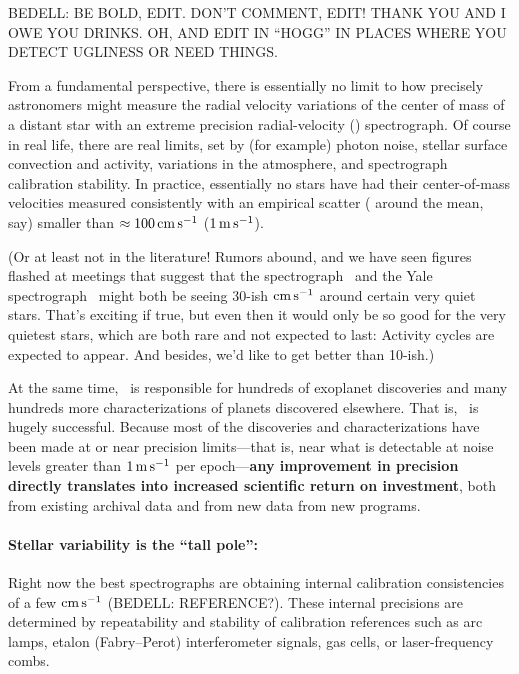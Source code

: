 \documentclass[12pt, letterpaper]{article}
\begin{document}
\sloppy\sloppypar\raggedbottom\frenchspacing

BEDELL: BE BOLD, EDIT. DON'T COMMENT, EDIT! THANK YOU AND I OWE YOU DRINKS. OH, AND EDIT IN ``HOGG'' IN PLACES WHERE YOU DETECT UGLINESS OR NEED THINGS.


\noindent
From a fundamental perspective, there is essentially no limit to how
precisely astronomers might measure the radial velocity variations
of the center of mass
of a distant star with an extreme precision radial-velocity (\EPRV) spectrograph.
Of course in real life, there are real limits, set
by (for example) photon noise, stellar surface convection and activity,
variations in the atmosphere, and spectrograph calibration stability.
In practice, essentially no stars have had their center-of-mass
velocities measured consistently with an empirical scatter
( around the mean, say) smaller than $\approx 100\,{\mathrm{cm\,s^{-1}}}$ ($1\,{\mathrm{m\,s^{-1}}}$).

(Or at least not in the literature! Rumors abound, and we have seen
figures flashed at meetings that suggest that the  spectrograph
\ESPRESSO\ and the Yale spectrograph \EXPRES\ might both
be seeing 30-ish ${\mathrm{cm\,s^{-1}}}$ around certain very quiet stars. That's exciting
if true, but even then it would only be so good for the very quietest stars, which
are both rare and not expected to last: Activity cycles are expected to
appear. And besides, we'd like to get better than 10-ish.)

At the same time, \EPRV\ is responsible for hundreds of  exoplanet discoveries and many hundreds more  characterizations of planets discovered elsewhere.
That is, \EPRV\ is hugely successful.
Because most of the discoveries and characterizations have been made
at or near precision limits---that is, near what is detectable at noise levels
greater than $1\,{\mathrm{m\,s^{-1}}}$ per epoch---\textbf{any improvement in precision directly
translates into increased scientific return on investment},
both from existing archival data and from new data from new programs.

\paragraph{Stellar variability is the ``tall pole'':}
Right now the best spectrographs are obtaining internal calibration
consistencies of a few ${\mathrm{cm\,s^{-1}}}$ (BEDELL: REFERENCE?).
These internal precisions are determined by repeatability and
stability of calibration references such as arc lamps, etalon
(Fabry--Perot) interferometer signals, gas cells, or laser-frequency
combs.
\end{document}
